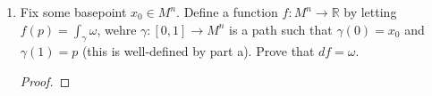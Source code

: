\documentclass{article}
\begin{document}
\begin{enumerate}[label={\bf Q\arabic*:}]
\begin{enumerate}
\begin{proof}
          Then $\gamma$ is a smooth path, even at $t=1$, because from
          our choice of $h$, there will be an open interval containing
          $t=1$ where $\gamma$ is constant. Furthurmore, $\gamma$ is a
          closed path, so from Question 2b we have $\int_\gamma\omega=0$.
          Now
          \begin{align*}
            0 &=\int_\gamma\omega \\
              &=\int_{\gamma_1\circ h}\omega - \int_{\gamma_2\circ h}\omega
                \\
              &=\int_{\gamma_1}\omega - \int_{\gamma_2}\omega &(\text{from
                Question 1}), \\
          \end{align*}
          and so $\int_{\gamma_1}\omega=\int_{\gamma_2}\omega$ as required.
        \end{proof}

      \item Fix some basepoint $x_0\in M^n$. Define a function
        $f:M^n\rightarrow\mathbb{R}$ by letting $f(p)=\int_\gamma\omega$,
        wehre $\gamma:[0,1]\rightarrow M^n$ is a path such that
        $\gamma(0)=x_0$ and $\gamma(1)=p$ (this is well-defined by part a).
        Prove that $df=\omega$.

        \begin{proof}
        \end{proof}
    \end{enumerate}
\end{enumerate}
\end{document}
